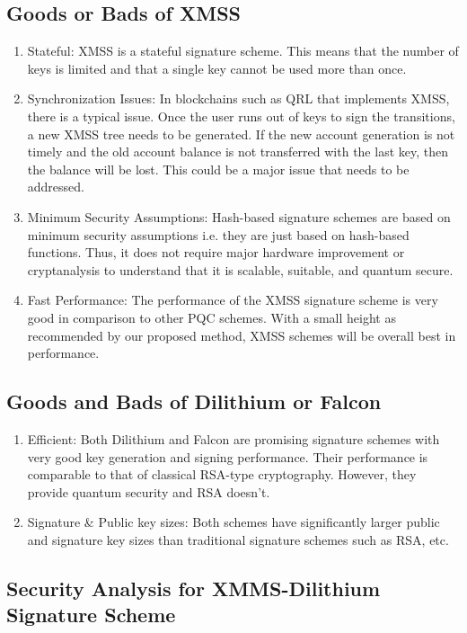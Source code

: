 \documentclass[lettersize,journal]{IEEEtran}
\begin{document}
\subsection{Goods or Bads of XMSS}
\begin{enumerate}
    \item Stateful: XMSS is a stateful signature scheme. This means that the number of keys is limited and that a single key cannot be used more than once.
    \item Synchronization Issues: In blockchains such as QRL \cite{QuantumResistantLedger2016} that implements XMSS, there is a typical issue. Once the user runs out of keys to sign the transitions, a new XMSS tree needs to be generated. 
    If the new account generation is not timely and the old account balance is not transferred with the last key, then the balance will be lost. This could be a major issue that needs to be addressed.
    \item Minimum Security Assumptions: Hash-based signature schemes are based on minimum security assumptions i.e. they are just based on hash-based functions. Thus, it does not require major hardware improvement or cryptanalysis to understand that it is scalable, suitable, and quantum secure.
    \item Fast Performance: The performance of the XMSS signature scheme is very good in comparison to other PQC schemes. With a small height as recommended by our proposed method, XMSS schemes will be overall best in performance.   
\end{enumerate}

\subsection{Goods and Bads of Dilithium or Falcon}
\begin{enumerate}
    \item Efficient: Both Dilithium and Falcon are promising signature schemes with very good key generation and signing performance. 
    Their performance is comparable to that of classical RSA-type cryptography. However, they provide quantum security and RSA doesn't. 
    \item Signature \& Public key sizes: Both schemes have significantly larger public and signature key sizes than traditional signature schemes such as RSA, etc.
\end{enumerate}

\subsection{Security Analysis for XMMS-Dilithium Signature Scheme}
\end{document}

